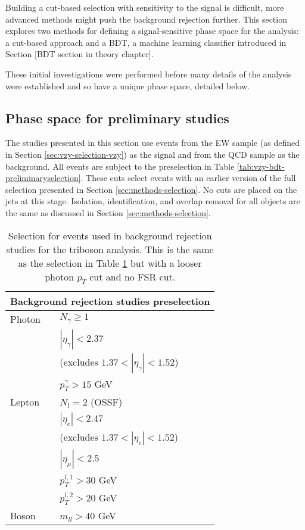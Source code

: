 Building a cut-based selection with sensitivity to the signal is difficult, more
advanced methods might push the background rejection further. This section
explores two methods for defining a signal-sensitive phase space for the
analysis: a cut-based approach and a \ac{BDT}, a machine learning classifier
introduced in Section [BDT section in theory chapter]. %

These initial investigations were performed before many details of the analysis
were established and so have a unique phase space, detailed below.

\subsection{Phase space for preliminary studies}

The studies presented in this section use events from the \ac{EW} \VZy sample
(as defined in Section \ref{sec:vzy-selection-vzy}) as the signal and from the
\ac{QCD} \Zy sample as the background. All events are subject to the
preselection in Table \ref{tab:vzy-bdt-preliminaryselection}.  These cuts select
\Zy events with an earlier version of the full \Zy selection presented in
Section \ref{sec:methods-selection}.  No cuts are placed on the jets at this
stage.  Isolation, identification, and overlap removal for all objects are the
same as discussed in Section \ref{sec:methods-selection}.

\begin{table}
  \centering
  \renewcommand\arraystretch{1.3}
  \begin{tabular}{p{6em}l}
    \hline\hline
    \multicolumn{2}{c}{Background rejection studies preselection} \\
    \hline
    Photon & $N_\gamma \geq 1$ \\
           & $|\eta_\gamma| < 2.37$ \\
           & (excludes $1.37 < |\eta_\gamma| < 1.52$) \\
           & $p_T^\gamma > 15$ GeV \\
    \hline
    Lepton & $N_l = 2$ (OSSF)\\
           & $|\eta_e| < 2.47$ \\
           & (excludes $1.37 < |\eta_e| < 1.52$) \\
           & $|\eta_\mu| < 2.5$ \\
           & $p_T^{l,1} > 30$ GeV \\
           & $p_T^{l,2} > 20$ GeV \\
    \hline
    Boson  & $m_{ll} > 40$ GeV \\
    \hline\hline
  \end{tabular}
  \caption{
    Selection for events used in background rejection studies for the \VZy
    triboson analysis. This is the same as the \Zy selection in Table
    \ref{tab:anacom-zy-selection} but with a looser photon $p_T$ cut and no
    \ac{FSR} cut.
  }
  \label{tab:anacom-zy-selection}
\end{table}


